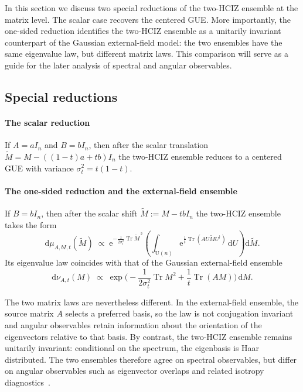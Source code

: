 \documentclass[11pt,a4paper]{article}
\theoremstyle{definition}\newtheorem{definition}[theorem]{Definition}
\theoremstyle{remark}\newtheorem{remark}[theorem]{Remark}
\numberwithin{equation}{section}
\DeclareMathOperator{\Tr}{Tr}
\newcommand{\e}{\mathrm{e}}
\newcommand{\dd}{\mathrm{d}}
\newcommand{\UU}{\mathrm{U}(n)}
\begin{document}
In this section we discuss two special reductions of the two-HCIZ ensemble at the matrix level. The scalar case recovers the centered GUE. More importantly, the one-sided reduction identifies the two-HCIZ ensemble as a unitarily invariant counterpart of the Gaussian external-field model: the two ensembles have the same eigenvalue law, but different matrix laws. This comparison will serve as a guide for the later analysis of spectral and angular observables.

\subsection{Special reductions}

\paragraph{The scalar reduction}

If $A=aI_n$ and $B=bI_n$, then after the scalar translation
$\widetilde M=M-((1-t)a+tb)I_n$ the two-HCIZ ensemble reduces to a centered GUE
with variance $\sigma_t^2=t(1-t)$.

\paragraph{The one-sided reduction and the external-field ensemble}

If $B=bI_n$, then after the scalar shift $\widetilde M:=M-tbI_n$ the two-HCIZ ensemble takes the form
\begin{equation}
\dd\mu_{A,bI,t}(\widetilde M)\;\propto\;
\e^{-\frac{1}{2\sigma_t^2}\Tr \widetilde M^{\,2}}
\left(\int_{\UU}\e^{\frac{1}{t}\Tr(AU\widetilde M U^\dagger)}\,\dd U\right)\dd \widetilde M.
\end{equation}
Its eigenvalue law coincides with that of the Gaussian external-field ensemble
\begin{equation}
\dd\nu_{A,t}(M)
\;\propto\;
\exp\!\Big(-\frac{1}{2\sigma_t^2}\Tr M^2+\frac{1}{t}\Tr(AM)\Big)\,\dd M.
\end{equation}

The two matrix laws are nevertheless different. In the external-field ensemble, the source matrix $A$ selects a preferred basis, so the law is not conjugation invariant and angular observables retain information about the orientation of the eigenvectors relative to that basis. By contrast, the two-HCIZ ensemble remains unitarily invariant: conditional on the spectrum, the eigenbasis is Haar distributed. The two ensembles therefore agree on spectral observables, but differ on angular observables such as eigenvector overlaps and related isotropy diagnostics~\cite{PaccoRos2023,BenigniCipolloni2024}.
\end{document}
